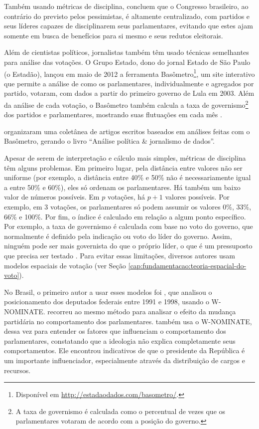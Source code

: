 Também usando métricas de disciplina,  concluem que o
Congresso brasileiro, ao contrário do previsto pelos pessimistas, é altamente
centralizado, com partidos e seus líderes capazes de disciplinarem seus
parlamentares, evitando que estes ajam somente em busca de benefícios para si
mesmo e seus redutos eleitorais.

Além de cientistas políticos, jornalistas também têm usado técnicas semelhantes
para análise das votações. O Grupo Estado, dono do jornal Estado de São Paulo
(o Estadão), lançou em maio de 2012 a ferramenta Basômetro\footnote{Disponível
em \url{http://estadaodados.com/basometro/}.}, um site interativo que permite a
análise de como os parlamentares, individualmente e agregados por partido,
votaram, com dados a partir do primeiro governo de Lula em 2003. Além da
análise de cada votação, o Basômetro também calcula a taxa de
governismo\footnote{A taxa de governismo é calculada como o percentual de vezes
que os parlamentares votaram de acordo com a posição do governo.} dos partidos
e parlamentares, mostrando suas flutuações em cada mês \cite{Estadao2012}.

 organizaram uma coletânea de artigos escritos baseados
em análises feitas com o Basômetro, gerando o livro ``Análise política \&
jornalismo de dados''.

Apesar de serem de interpretação e cálculo mais simples, métricas de disciplina têm
alguns problemas. Em primeiro lugar, pela distância entre valores não ser
uniforme (por exemplo, a distância entre 40\% e 50\% não é necessariamente
igual a entre 50\% e 60\%), eles só ordenam os parlamentares. Há também um
baixo valor de números possíveis. Em $p$ votações, há $p + 1$ valores
possíveis. Por exemplo, em 3 votações, os parlamentares só podem assumir os
valores 0\%, 33\%, 66\% e 100\%. Por fim, o índice é calculado em relação a
algum ponto específico. Por exemplo, a taxa de governismo é calculada com base
no voto do governo, que normalmente é definido pela indicação ou voto do líder
do governo. Assim, ninguém pode ser mais governista do que o próprio líder, o
que é um pressuposto que precisa ser testado
\cite{Poole2005,McCarty2011,Izumi2013}. Para evitar essas limitações, diversos
autores usam modelos espaciais de votação (ver Seção
\ref{cap:fundamentacao:teoria-espacial-do-voto}).

No Brasil, o primeiro autor a usar esses modelos foi ,
que analisou o posicionamento dos deputados federais entre 1991 e 1998, usando
o W-NOMINATE.  recorreu ao mesmo método para
analisar o efeito da mudança partidária no comportamento dos parlamentares.
 também usa o W-NOMINATE, dessa vez para entender os
fatores que influenciam o comportamento dos parlamentares, constatando que a
ideologia não explica completamente seus comportamentos. Ele encontrou
indicativos de que o presidente da República é um importante influenciador,
especialmente através da distribuição de cargos e recursos.

